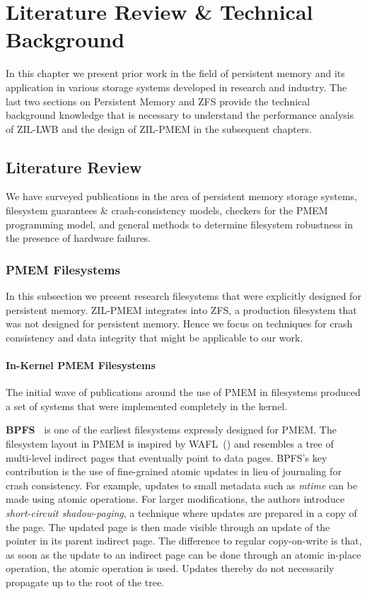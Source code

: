 \documentclass[12pt,a4paper,twoside]{book}
\begin{document}
\chapter{Literature Review \& Technical Background}\label{ch:litreviewandbackground}
In this chapter we present prior work in the field of persistent memory and its application in various storage systems developed in research and industry.
The last two sections on Persistent Memory and ZFS provide the technical background knowledge that is necessary to understand the performance analysis of ZIL-LWB and the design of ZIL-PMEM in the subsequent chapters.

\section{Literature Review}
We have surveyed publications in the area of persistent memory storage systems, filesystem guarantees \& crash-consistency models, checkers for the PMEM programming model, and general methods to determine filesystem robustness in the presence of hardware failures.

\subsection{PMEM Filesystems}
In this subsection we present research filesystems that were explicitly designed for persistent memory.
ZIL-PMEM integrates into ZFS, a production filesystem that was not designed for persistent memory.
Hence we focus on techniques for crash consistency and data integrity that might be applicable to our work.

\subsubsection{In-Kernel PMEM Filesystems}\label{sec:in_kernel_pmem_filesystems}
The initial wave of publications around the use of PMEM in filesystems produced a set of systems that were implemented completely in the kernel.

\newcommand{\citerelwork}[2]{\textbf{#1~\cite{#2}}}

\citerelwork{BPFS}{conditBetterByteaddressablePersistent2009} is one of the earliest filesystems expressly designed for PMEM.
The filesystem layout in PMEM is inspired by WAFL~(\cite{hitzFileSystemDesign1994}) and resembles a tree of multi-level indirect pages that eventually point to data pages.
BPFS’s key contribution is the use of fine-grained atomic updates in lieu of journaling for crash consistency.
For example, updates to small metadata such as \textit{mtime} can be made using atomic operations.
For larger modifications, the authors introduce \textit{short-circuit shadow-paging}, a technique where updates are prepared in a copy of the page.
The updated page is then made visible through an update of the pointer in its parent indirect page.
The difference to regular copy-on-write is that, as soon as the update to an indirect page can be done through an atomic in-place operation, the atomic operation is used.
Updates thereby do not necessarily propagate up to the root of the tree.
\end{document}
